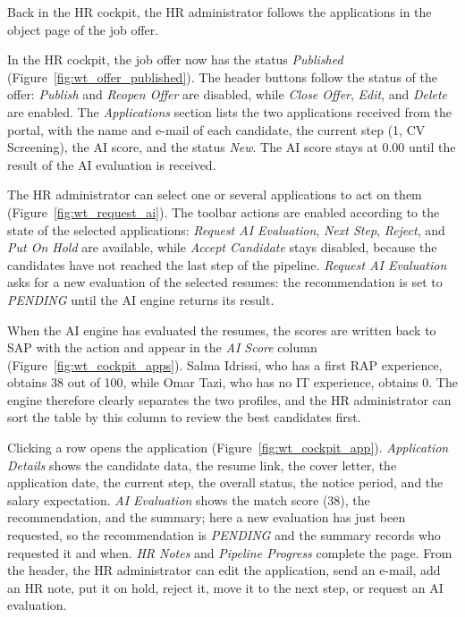 Back in the HR cockpit, the HR administrator follows the applications in the object page of the job offer.


In the HR cockpit, the job offer now has the status \emph{Published} (Figure~\ref{fig:wt_offer_published}). The header buttons follow the status of the offer: \emph{Publish} and \emph{Reopen Offer} are disabled, while \emph{Close Offer}, \emph{Edit}, and \emph{Delete} are enabled. The \emph{Applications} section lists the two applications received from the portal, with the name and e-mail of each candidate, the current step (1, CV Screening), the AI score, and the status \emph{New}. The AI score stays at 0.00 until the result of the AI evaluation is received.


The HR administrator can select one or several applications to act on them (Figure~\ref{fig:wt_request_ai}). The toolbar actions are enabled according to the state of the selected applications: \emph{Request AI Evaluation}, \emph{Next Step}, \emph{Reject}, and \emph{Put On Hold} are available, while \emph{Accept Candidate} stays disabled, because the candidates have not reached the last step of the pipeline. \emph{Request AI Evaluation} asks for a new evaluation of the selected resumes: the recommendation is set to \emph{PENDING} until the AI engine returns its result.


When the AI engine has evaluated the resumes, the scores are written back to SAP with the  action and appear in the \emph{AI Score} column (Figure~\ref{fig:wt_cockpit_apps}). Salma Idrissi, who has a first RAP experience, obtains 38 out of 100, while Omar Tazi, who has no IT experience, obtains 0. The engine therefore clearly separates the two profiles, and the HR administrator can sort the table by this column to review the best candidates first.


Clicking a row opens the application (Figure~\ref{fig:wt_cockpit_app}). \emph{Application Details} shows the candidate data, the resume link, the cover letter, the application date, the current step, the overall status, the notice period, and the salary expectation. \emph{AI Evaluation} shows the match score (38), the recommendation, and the summary; here a new evaluation has just been requested, so the recommendation is \emph{PENDING} and the summary records who requested it and when. \emph{HR Notes} and \emph{Pipeline Progress} complete the page. From the header, the HR administrator can edit the application, send an e-mail, add an HR note, put it on hold, reject it, move it to the next step, or request an AI evaluation.

